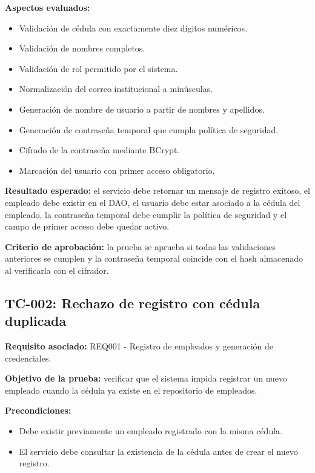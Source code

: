 \documentclass[12pt,a4paper]{article}
\begin{document}
\textbf{Aspectos evaluados:}
\begin{itemize}[leftmargin=*]
    \item Validación de cédula con exactamente diez dígitos numéricos.
    \item Validación de nombres completos.
    \item Validación de rol permitido por el sistema.
    \item Normalización del correo institucional a minúsculas.
    \item Generación de nombre de usuario a partir de nombres y apellidos.
    \item Generación de contraseña temporal que cumpla política de seguridad.
    \item Cifrado de la contraseña mediante BCrypt.
    \item Marcación del usuario con primer acceso obligatorio.
\end{itemize}

\textbf{Resultado esperado:} el servicio debe retornar un mensaje de registro exitoso, el empleado debe existir en el DAO, el usuario debe estar asociado a la cédula del empleado, la contraseña temporal debe cumplir la política de seguridad y el campo de primer acceso debe quedar activo.

\textbf{Criterio de aprobación:} la prueba se aprueba si todas las validaciones anteriores se cumplen y la contraseña temporal coincide con el hash almacenado al verificarla con el cifrador.

\subsection{TC-002: Rechazo de registro con cédula duplicada}

\textbf{Requisito asociado:} REQ001 - Registro de empleados y generación de credenciales.

\textbf{Objetivo de la prueba:} verificar que el sistema impida registrar un nuevo empleado cuando la cédula ya existe en el repositorio de empleados.

\textbf{Precondiciones:}
\begin{itemize}[leftmargin=*]
    \item Debe existir previamente un empleado registrado con la misma cédula.
    \item El servicio debe consultar la existencia de la cédula antes de crear el nuevo registro.
\end{itemize}
\end{document}
